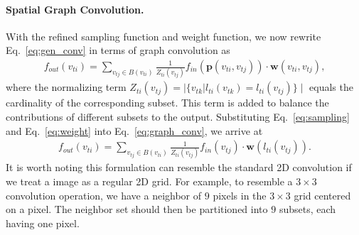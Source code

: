 \documentclass[letterpaper]{article} %
\begin{document}
\paragraph{Spatial Graph Convolution.}
With the refined sampling function and weight function, we now rewrite Eq.~\ref{eq:gen_conv} in terms of graph convolution as
\begin{align}
	\label{eq:graph_conv}
	f_{out}(v_{ti}) = \sum_{v_{tj}\in B(v_{ti})} \frac{1}{Z_{ti}(v_{tj})}f_{in}(\mathbf{p}(v_{ti}, v_{tj}))\cdot \mathbf{w}(v_{ti}, v_{tj}),
\end{align}
where the normalizing term
$
Z_{ti}(v_{tj}) = \mid\{ v_{tk} |  l_{ti}(v_{tk}) = l_{ti}(v_{tj})\}\mid
$
equals the cardinality of the corresponding subset.
This term is added to balance the contributions of different subsets to the output.
Substituting Eq.~\ref{eq:sampling} and Eq.~\ref{eq:weight} into Eq.~\ref{eq:graph_conv}, we arrive at
\begin{align}
		\label{eq:graph_conv_simplify}
		f_{out}(v_{ti}) = \sum_{v_{tj}\in B(v_{ti})} \frac{1}{Z_{ti}(v_{tj})}f_{in}(v_{tj})\cdot \mathbf{w}(l_{ti}(v_{tj})).
\end{align}
It is worth noting this formulation can resemble the standard 2D convolution if we treat a image as a regular 2D grid.
For example, to resemble a $ 3\times 3 $ convolution operation, we have a neighbor of $ 9 $ pixels in the $ 3\times 3 $ grid centered on a pixel.
The neighbor set should then be partitioned into $ 9 $ subsets, each having one pixel.
\end{document}

